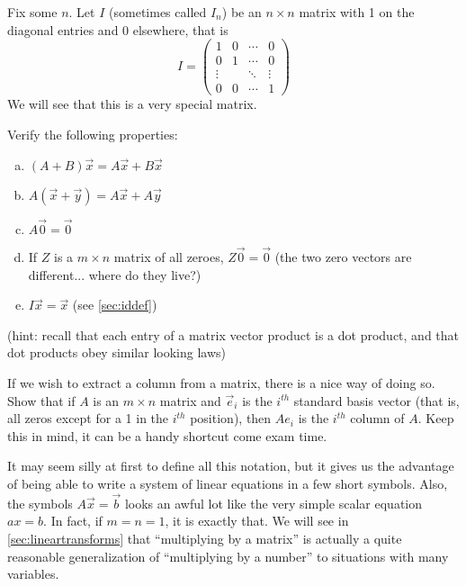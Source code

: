 \documentclass[Main.tex]{subfiles}
\begin{document}
\begin{Def}
  \label{sec:iddef}
  Fix some $n$.  
  Let $I$ (sometimes called $I_n$) be an $n\times n$ matrix with 1 on the diagonal entries and 0 elsewhere, that is
  \[I=\left(\begin{array}{cccc}
      1 & 0  & \cdots & 0\\
      0 & 1  & \cdots &  0\\
      \vdots && \ddots  & \vdots\\
      0 &0 & \cdots  & 1
    \end{array}\right)\]
  We will see that this is a very special matrix.  
\end{Def}
\begin{Ex}
  \label{sec:matvecprops}
  Verify the following properties:
  \begin{enumerate}[a)]
    \item $(A+B)\vec{x} = A\vec{x} + B\vec{x}$
    \item $A(\vec{x} + \vec{y}) = A\vec{x} + A\vec{y}$
    \item $A\vec{0} = \vec{0}$
    \item If $Z$ is a $m\times n$ matrix of all zeroes, $Z\vec{0} = \vec{0}$ (the two zero vectors are different... where do they live?)
    \item $I\vec{x}=\vec{x}$ (see \ref{sec:iddef})
  \end{enumerate}
  (hint: recall that each entry of a matrix vector product is a dot product, and that dot products obey similar looking laws)
\end{Ex}
\begin{Ex}
  \label{sec:extractcol}
  If we wish to extract a column from a matrix, there is a nice way of doing so.
  Show that if $A$ is an $m\times n$ matrix and $\vec{e}_i$ is the $i^{th}$ standard basis vector (that is, all zeros except for a 1 in the $i^{th}$ position), then $Ae_i$ is the $i^{th}$ column of $A$.
  Keep this in mind, it can be a handy shortcut come exam time.
\end{Ex}
\begin{Remark}
  It may seem silly at first to define all this notation, but it gives us the advantage of being able to write a system of linear equations in a few short symbols.  
  Also, the symbols $A\vec{x}=\vec{b}$ looks an awful lot like the very simple scalar equation $ax=b$.  
  In fact, if $m=n=1$, it is exactly that.  
  We will see in \ref{sec:lineartransforms} that ``multiplying by a matrix'' is actually a quite reasonable generalization of ``multiplying by a number'' to situations with many variables.
\end{Remark}
\exersisesg
\end{document}
